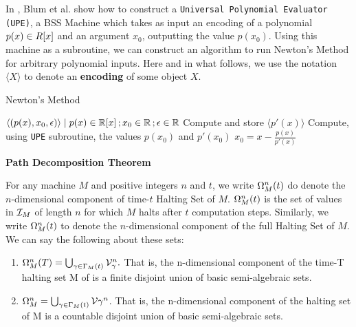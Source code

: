   \begin{example}
    In \cite{B98}, Blum et al. show how to construct a
    \texttt{Universal Polynomial Evaluator (UPE)}, a BSS Machine which
    takes as input an encoding of a polynomial $p(x) \in R[x]$ and
    an argument $x_0$, outputting the value $p(x_0)$.  Using this
    machine as a subroutine, we can construct an algorithm to run
    Newton's Method for arbitrary polynomial inputs.  Here and in what
    follows, we use the notation $\langle X \rangle$ to denote an
    \textbf{encoding} of some object $X$.

    \begin{algorithm}
      \caption{Newton's Method} \label{alg:newton}
      \begin{algorithmic}
        \Require $\langle (p(x), x_0, \epsilon) \rangle \mid p(x) \in \mathbb{R}[x]\,; x_0 \in \mathbb{R}\,; \epsilon \in \mathbb{R}$
        \State Compute and store $\langle p'(x) \rangle$
        \State Compute, using \texttt{UPE} subroutine, the values $p(x_0)$ and $p'(x_0)$
        \State $x_0 = x - \frac{p(x)}{p'(x)}$
        \EndWhile
      \end{algorithmic}
    \end{algorithm}
  \end{example}


  \begin{theorem}{\textbf{Path Decomposition Theorem}}
    
    For any machine $M$ and positive integers $n$ and $t$, we write
    $\Omega_M^n(t)$ do denote the $n$-dimensional component of
    time-$t$ Halting Set of $M$.  $\Omega_M^n(t)$ is the set of
    values in $\mathcal{I}_M$ of length $n$ for which $M$ halts after $t$
    computation steps.  Similarly, we write $\Omega_M^n(t)$ to
    denote the $n$-dimensional component of the full Halting Set of
    $M$.  We can say the following about these sets:

    \begin{enumerate}
    \item $\Omega_M^n(T) = \bigcup_{\gamma \in \Gamma_M(t)}
      \mathcal{V}_\gamma^n.$ That is, the n-dimensional
      component of the time-T halting set M of is a finite disjoint union
      of basic semi-algebraic sets.
    \item $\Omega_M^n = \bigcup_{\gamma \in \Gamma_M(t)}
      \mathcal{V}{\gamma}^n$.  That is, the n-dimensional
      component of the halting set of M is a countable disjoint union
      of basic semi-algebraic sets.
      
    \end{enumerate}
  \end{theorem}

